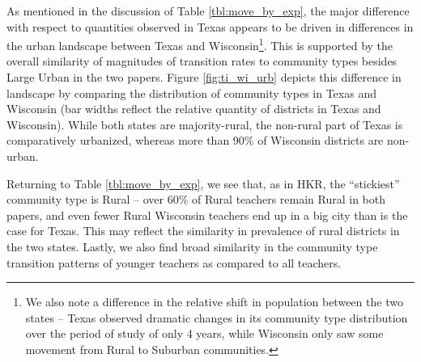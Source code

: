 As mentioned in the discussion of Table \ref{tbl:move_by_exp}, the major
difference with respect to quantities observed in Texas appears to be
driven in differences in the urban landscape between Texas and
Wisconsin\footnote{We also note a difference in the relative shift in
  population between the two states -- Texas observed dramatic changes
  in its community type distribution over the period of study of only 4
  years, while Wisconsin only saw some movement from Rural to Suburban
  communities.}. This is supported by the overall similarity of
magnitudes of transition rates to community types besides Large Urban in
the two papers. Figure \ref{fig:ti_wi_urb} depicts this difference in
landscape by comparing the distribution of community types in Texas and
Wisconsin (bar widths reflect the relative quantity of districts in
Texas and Wisconsin). While both states are majority-rural, the
non-rural part of Texas is comparatively urbanized, whereas more than
90\% of Wisconsin districts are non-urban.

Returning to Table \ref{tbl:move_by_exp}, we see that, as in HKR, the
``stickiest'' community type is Rural -- over 60\% of Rural teachers
remain Rural in both papers, and even fewer Rural Wisconsin teachers end
up in a big city than is the case for Texas. This may reflect the
similarity in prevalence of rural districts in the two states. Lastly,
we also find broad similarity in the community type transition patterns
of younger teachers as compared to all teachers.

